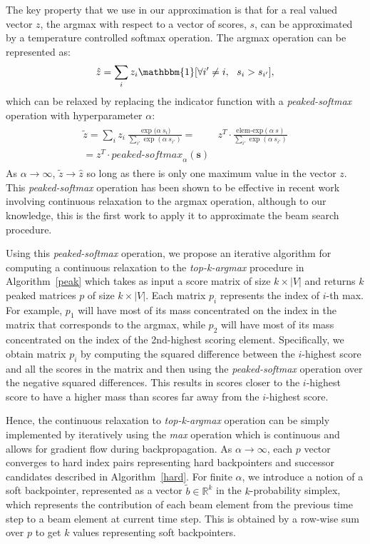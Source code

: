 \documentclass[letterpaper]{article} \usepackage{aaai18}  \usepackage{times}  \usepackage{helvet}  \usepackage{courier}  \usepackage{url}  \usepackage{graphicx}  \frenchspacing
\begin{document}
The key property that we use in our approximation is that for a real valued vector $z$, the argmax with respect to a vector of scores, $s$, can be approximated by a temperature controlled softmax operation. The argmax operation can be represented as:
\begin{align*}
    \hat{z} = \sum_i z_i\mathbbm{1}[\forall i' \ne i,\ \ s_i > s_{i'}],
\end{align*}
which can be relaxed by replacing the indicator function with a \emph{peaked-softmax} operation with hyperparameter $\alpha$:
\begin{align*}
 \begin{split}
    \tilde{z} = \sum_i z_i~ \frac{\exp{(\alpha~ s_i})}{\sum_{i'} \exp{(\alpha~ s_{i'})}} = & z^T \cdot \frac{\textrm{elem-exp}(\alpha~ s)}{\sum_{i'} \exp{(\alpha~ s_{i'})}}\\= z^T \cdot \textit{peaked-softmax}_{\alpha}(\mathbf{s})
 \end{split}
\end{align*}
As $\alpha \to \infty$, $\tilde{z} \to \hat{z}$ so long as there is only one maximum value in the vector $z$. This \emph{peaked-softmax} operation has been shown to be effective in recent work \cite{maddison2016concrete,jang2016categorical,softgreedy} involving continuous relaxation to the argmax operation, although to our knowledge, this is the first work to apply it to approximate the beam search procedure. 

Using this \emph{peaked-softmax} operation, we propose an iterative algorithm for computing a continuous relaxation to the \textit{top-k-argmax} procedure in Algorithm~\ref{peak} which takes as input a score matrix of size $k\times |V|$ and returns $k$ peaked matrices $p$ of size $k \times |V|$. Each matrix $p_{i}$ represents the index of $i$-th max. For example, $p_1$ will have most of its mass concentrated on the index in the matrix that corresponds to the argmax, while $p_2$ will have most of its mass concentrated on the index of the 2nd-highest scoring element. Specifically, we obtain matrix $p_i$ by computing the squared difference between the $i$-highest score and all the scores in the matrix and then using the \emph{peaked-softmax} operation over the negative squared differences. This results in scores closer to the $i$-highest score to have a higher mass than scores far away from the $i$-highest score.

Hence, the continuous relaxation to \textit{top-k-argmax} operation can be simply implemented by iteratively using the \textit{max} operation which is continuous and allows for gradient flow during backpropagation. As $\alpha \to \infty$, each $p$ vector converges to hard index pairs representing hard backpointers and successor candidates described in Algorithm~\ref{hard}. For finite $\alpha$, we introduce a notion of a soft backpointer, represented as a vector $\tilde{b} \in \mathbb{R}^k$ in the $k$-probability simplex, which represents the contribution of each beam element from the previous time step to a beam element at current time step. This is obtained by a row-wise sum over $p$ to get $k$ values representing soft backpointers. 
\end{document}
